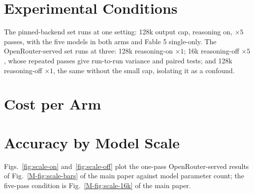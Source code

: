 \documentclass[journal,onecolumn]{IEEEtran}
\begin{document}
\section{Experimental Conditions}
\label{sec:conditions}

The pinned-backend set runs at one setting: 128k output cap, reasoning on,
$\times 5$ passes, with the five models in both arms and Fable 5 single-only. The
OpenRouter-served set runs at three: 128k reasoning-on $\times 1$; 16k reasoning-off
$\times 5$, whose repeated passes give run-to-run variance and paired tests; and 128k reasoning-off
$\times 1$, the same without the small cap, isolating it as a confound.

\section{Cost per Arm}



\section{Accuracy by Model Scale}

Figs.~\ref{fig:scale-on} and~\ref{fig:scale-off} plot the one-pass OpenRouter-served results of
Fig.~\ref{M-fig:scale-bars} of the main paper against model parameter count; the five-pass
condition is Fig.~\ref{M-fig:scale-16k} of the main paper.




\end{document}
